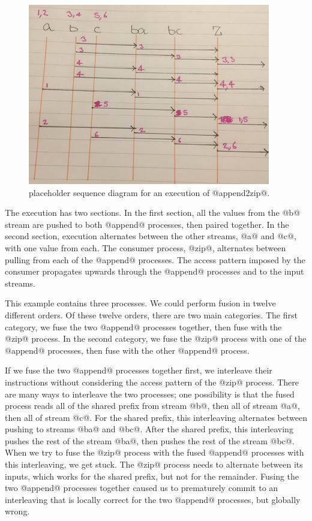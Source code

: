 \begin{figure}
\center
\includegraphics{figs/hand/append2zip-swim.jpg}
\caption[placeholder]{placeholder sequence diagram for an execution of @append2zip@.}
\label{figs/hand/append2zip-swim}
\end{figure}

The execution has two sections.
In the first section, all the values from the @b@ stream are pushed to both @append@ processes, then paired together.
In the second section, execution alternates between the other streams, @a@ and @c@, with one value from each.
The consumer process, @zip@, alternates between pulling from each of the @append@ processes.
The access pattern imposed by the consumer propagates upwards through the @append@ processes and to the input streams.


This example contains three processes.
We could perform fusion in twelve different orders.
Of these twelve orders, there are two main categories.
The first category, we fuse the two @append@ processes together, then fuse with the @zip@ process.
In the second category, we fuse the @zip@ process with one of the @append@ processes, then fuse with the other @append@ process.

If we fuse the two @append@ processes together first, we interleave their instructions without considering the access pattern of the @zip@ process.
There are many ways to interleave the two processes; one possibility is that the fused process reads all of the shared prefix from stream @b@, then all of stream @a@, then all of stream @c@.
For the shared prefix, this interleaving alternates between pushing to streams @ba@ and @bc@.
After the shared prefix, this interleaving pushes the rest of the stream @ba@, then pushes the rest of the stream @bc@.
When we try to fuse the @zip@ process with the fused @append@ processes with this interleaving, we get stuck.
The @zip@ process needs to alternate between its inputs, which works for the shared prefix, but not for the remainder.
Fusing the two @append@ processes together caused us to prematurely commit to an interleaving that is locally correct for the two @append@ processes, but globally wrong.

